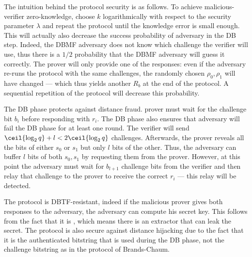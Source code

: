 The intuition behind the protocol security is as follows.
To achieve malicious-verifier zero-knowledge, choose \(k\) logarithmically with respect to the security parameter \(\lambda\) and repeat the protocol until the knowledge error is small enough.
This will actually also decrease the success probability of  adversary in the \ac{DB} step.
Indeed, the \ac{DBMF} adversary does not know which challenge the verifier will use, thus there is a \(1/2\) probability that the \ac{DBMF} adversary will guess it correctly.
The prover will only provide one of the responses: even if the adversary re-runs the protocol with the same challenges, the randomly chosen \(\rho_0, \rho_1\) will have changed --- which thus yields another \(R_b\) at the end of the protocol.
A sequential repetition of the protocol will decrease this probability.

The \ac{DB} phase protects against distance fraud.
 prover must wait for the challenge bit \(b_i\) before responding with \(r_i\).
The \ac{DB} phase also ensures that  adversary will fail the \ac{DB} phase for at least one round.
The verifier will send \(\ceil{\log_2 q} + l < 2\ceil{\log_2 q}\) challenges.
Afterwards, the prover reveals all the bits of either \(s_0\) or \(s_1\) but only \(l\) bits of the other.
Thus, the adversary can buffer \(l\) bits of both \(s_0, s_1\) by requesting them from the prover.
However, at this point the adversary must wait for \(b_{l+1}\) challenge bits from the verifier and then relay that challenge to the prover to receive the correct \(r_i\) --- this relay will be detected.

The protocol is \ac{DBTF}-resistant, indeed if the malicious prover gives both responses to the adversary, the adversary can compute his secret key.
This follows from the fact that it is , which means there is an extractor that can leak the secret.
The protocol is also secure against distance hijacking due to the fact
that it is the authenticated bitstring that is used during the \ac{DB}
phase, not the challenge bitstring as in the protocol of Brands-Chaum.
